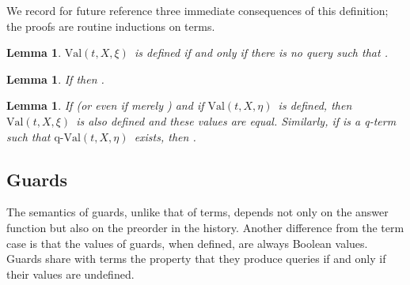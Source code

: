 \documentclass{LMCS}
\newtheorem{la}[thm]{Lemma}
\theoremstyle{definition}
\newcommand{\qval}[3]{\ensuremath{\text{q-Val}(#1,#2,#3)}}
\newcommand{\val}[3]{\ensuremath{\text{Val}(#1,#2,#3)}}
\begin{document}
We record for future reference three immediate consequences of this
definition; the proofs are routine inductions on terms.

\begin{la}   \label{df-noq-t}
  \val tX\xi\ is defined if and only if there is no query
 such that .
\end{la}

\begin{la}   \label{no-rep-t}
If  then .
\end{la}

\begin{la} \label{mon-t} If  (or even if merely
  ) and if \val tX\eta\ is defined, then
  \val tX\xi\ is also defined and these values are equal.  Similarly,
  if  is a q-term such that \qval tX\eta\ exists, then .

\end{la}



\subsection{Guards}

The semantics of guards, unlike that of terms, depends not only on the
answer function but also on the preorder in the history.  Another
difference from the term case is that the values of guards, when
defined, are always Boolean values.  Guards share with terms the
property that they produce queries if and only if their values are
undefined.
\end{document}
